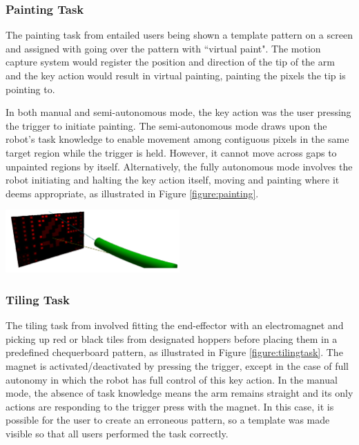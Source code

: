\documentclass[11pt]{article}
\begin{document}
\subsubsection{Painting Task}
The painting task from \cite{GreggSmithDesign} entailed users being shown a template pattern on a screen and assigned with going over the pattern with ``virtual paint". The motion capture system would register the position and direction of the tip of the arm and the key action would result in virtual painting, painting the pixels the tip is pointing to. 

In both manual and semi-autonomous mode, the key action was the user pressing the trigger to initiate painting. The semi-autonomous mode draws upon the robot's task knowledge to enable movement among contiguous pixels in the same target region while the trigger is held. However, it cannot move across gaps to unpainted regions by itself. Alternatively, the fully autonomous mode involves the robot initiating and halting the key action itself, moving and painting where it deems appropriate, as illustrated in Figure \ref{figure:painting}.

\begin{center}
\includegraphics[width=0.5\textwidth]{painting.png}
\label{figure:painting}
\end{center}

\subsubsection{Tiling Task}
The tiling task from \cite{GreggSmithDesign} involved fitting the end-effector with an electromagnet and picking up red or black tiles from designated hoppers before placing them in a predefined chequerboard pattern, as illustrated in Figure \ref{figure:tilingtask}. The magnet is activated/deactivated by pressing the trigger, except in the case of full autonomy in which the robot has full control of this key action. In the manual mode, the absence of task knowledge means the arm remains straight and its only actions are responding to the trigger press with the magnet. In this case, it is possible for the user to create an erroneous pattern, so a template was made visible so that all users performed the task correctly. 
\end{document}
